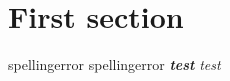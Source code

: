 \documentclass{article}
\newcommand\mygls\gls
\begin{document}
\section{First section}
\gls{spellingerror}
\mygls{spellingerror}
\textbf{\textit{test}}
\textit{test}
\end{document}
